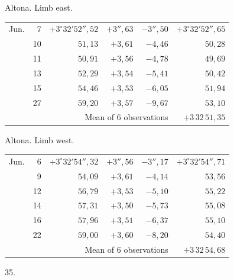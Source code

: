 \noindent\begin{minipage}[t]{.495\textwidth}\centering Altona. Limb east.\par\smallskip
{\scriptsize\setlength{\tabcolsep}{1pt}\renewcommand{\arraystretch}{1.2}\begin{tabular}{lr|r|r|r|r|}
Jun.&7&$+3^\circ32'52''{,}52$&$+3''{,}63$&$-3''{,}50$&$+3^\circ32'52''{,}65$\\
&10&$51{,}13$&$+3{,}61$&$-4{,}46$&$50{,}28$\\
&11&$50{,}91$&$+3{,}56$&$-4{,}78$&$49{,}69$\\
&13&$52{,}29$&$+3{,}54$&$-5{,}41$&$50{,}42$\\
&15&$54{,}46$&$+3{,}53$&$-6{,}05$&$51{,}94$\\
&27&$59{,}20$&$+3{,}57$&$-9{,}67$&$53{,}10$\\
\cline{6-6}\multicolumn{5}{r}{Mean of 6 observations}&$+3\,32\,51{,}35$
\end{tabular}}\end{minipage}\hfill\begin{minipage}[t]{.495\textwidth}\centering Altona. Limb west.\par\smallskip
{\scriptsize\setlength{\tabcolsep}{1pt}\renewcommand{\arraystretch}{1.2}\begin{tabular}{lr|r|r|r|r}
Jun.&6&$+3^\circ32'54''{,}32$&$+3''{,}56$&$-3''{,}17$&$+3^\circ32'54''{,}71$\\
&9&$54{,}09$&$+3{,}61$&$-4{,}14$&$53{,}56$\\
&12&$56{,}79$&$+3{,}53$&$-5{,}10$&$55{,}22$\\
&14&$57{,}31$&$+3{,}50$&$-5{,}73$&$55{,}08$\\
&16&$57{,}96$&$+3{,}51$&$-6{,}37$&$55{,}10$\\
&22&$59{,}00$&$+3{,}60$&$-8{,}20$&$54{,}40$\\
\cline{6-6}\multicolumn{5}{r}{Mean of 6 observations}&$+3\,32\,54{,}68$
\end{tabular}}\end{minipage}
\par\vspace{4mm}
\begin{center}35.\end{center}

